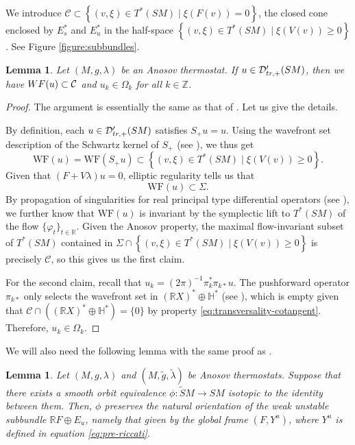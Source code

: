 \documentclass[reqno,12pt,letterpaper]{amsart}
\newtheorem{lemma}[proposition]{Lemma}
\theoremstyle{definition}
\theoremstyle{remark}
\theoremstyle{definition}
\numberwithin{equation}{section}
\newcommand{\R}{\mathbb{R}}
\newcommand{\Z}{\mathbb{Z}}
\begin{document}
We introduce $\mathcal{C}\subset \left\{(v, \xi)\in T^*(SM)\mid \xi(F(v))=0\right\}$, the closed cone enclosed by $E_s^\ast$ and $E_u^\ast$ in the half-space $\left\{(v, \xi)\in T^*(SM)\mid\xi(V(v))\geq 0\right\}$. See Figure \ref{figure:subbundles}. 
\begin{lemma}\label{lemma:wavefrontset}
Let $(M, g, \lambda)$ be an Anosov thermostat. If $u\in \mathcal{D}'_{\textup{tr},+}(SM)$, then we have $\textup{WF}(u)\subset  \mathcal{C}$ and $u_k \in \Omega_k$ for all $k\in \Z$. 
\end{lemma}
\begin{proof}
The argument is essentially the same as that of \cite[Lemma 2.5]{guillarmou25}. Let us give the details. 

By definition, each $u\in \mathcal{D}'_{\textup{tr},+}(SM)$ satisfies $S_+ u = u$. Using the wavefront set description of the Schwartz kernel of $S_+$ (see \cite[Lemma 3.10]{guillarmou17}), we thus get
$$\text{WF}(u)=\text{WF}(S_+ u)\subset \left\{(v, \xi)\in T^*(SM)\mid \xi(V(v))\geq 0\right\}.$$
Given that $(F+V\lambda)u=0$, elliptic regularity tells us that 
$$\text{WF}(u)\subset \Sigma.$$
By propagation of singularities for real principal type differential operators (see \cite[Theorem 26.1.1]{hormander09}), we further know that $\text{WF}(u)$ is invariant by the symplectic lift to $T^*(SM)$ of the flow $\{\varphi_t\}_{t\in \R}$. Given the Anosov property, the maximal flow-invariant subset of $T^*(SM)$ contained in $\Sigma \cap \left\{(v, \xi)\in T^*(SM)\mid \xi(V(v))\geq 0\right\}$ is precisely $\mathcal{C}$, so this gives us the first claim. 

For the second claim, recall that $u_k = (2\pi)^{-1}\pi_k^\ast\pi_{k\ast}u$. 
The pushforward operator $\pi_{k\ast}$ only selects the wavefront set in $(\R X)^\ast\oplus \mathbb{H}^*$ (see \cite[Proposition 11.3.3]{friedlander99}), which is empty given that $\mathcal{C}\cap((\R X)^\ast\oplus \mathbb{H}^*)=\{0\}$ by property \eqref{eq:transversality-cotangent}. Therefore, $u_k\in \Omega_k$.
\end{proof}

We will also need the following lemma with the same proof as \cite[Lemma 3.3]{guillarmou25}.

\begin{lemma}\label{lemma:sub-orientation}
Let $(M, g, \lambda)$ and $(M, \tilde{g}, \tilde{\lambda})$ be Anosov thermostats. Suppose that there exists a smooth orbit equivalence $\phi : \widetilde{S}M\to SM$ isotopic to the identity between them. Then, $\phi$ preserves the natural orientation of the weak unstable subbundle $\R F\oplus E_u$, namely that given by the global frame $(F, Y^u)$, where $Y^u$ is defined in equation \eqref{eq:pre-riccati}.
\end{lemma}
\end{document}
